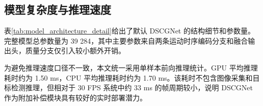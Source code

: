 \documentclass[journal]{IEEEtran}
\begin{document}
\begin{center}
\label{tab:ablation_modules}
\begingroup
\small
\setlength{\tabcolsep}{3pt}
\renewcommand{\arraystretch}{2.10}
\endgroup
\end{center}

\subsection{模型复杂度与推理速度}
表\ref{tab:model_architecture_detail}给出了默认 DSCGNet 的结构细节和参数量。完整模型总参数量为 39 284，其中主要参数来自两条运动时序编码分支和融合输出头，质量分支仅引入较小额外开销。

为避免推理速度口径不一致，本文统一采用单样本前向推理统计。GPU 平均推理耗时约为 1.50 ms，CPU 平均推理耗时约为 1.70 ms。该耗时不包含图像采集和目标检测推理，但相对于 30 FPS 系统中约 33 ms 的帧周期较小，说明 DSCGNet 作为附加补偿模块具有较好的实时部署潜力。
\end{document}
